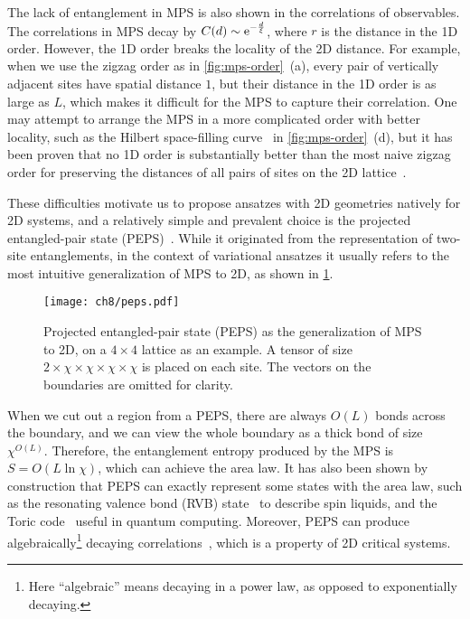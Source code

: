 The lack of entanglement in MPS is also shown in the correlations of observables. The correlations in MPS decay by $C(d) \sim \mathrm{e}^{-\frac{d}{\xi}}$, where $r$ is the distance in the 1D order. However, the 1D order breaks the locality of the 2D distance. For example, when we use the zigzag order as in \cref{fig:mps-order}~(a), every pair of vertically adjacent sites have spatial distance $1$, but their distance in the 1D order is as large as $L$, which makes it difficult for the MPS to capture their correlation. One may attempt to arrange the MPS in a more complicated order with better locality, such as the Hilbert space-filling curve~\cite{hilbert1891uber} in \cref{fig:mps-order}~(d), but it has been proven that no 1D order is substantially better than the most naive zigzag order for preserving the distances of all pairs of sites on the 2D lattice~\cite{xu2012lower}.

These difficulties motivate us to propose ansatzes with 2D geometries natively for 2D systems, and a relatively simple and prevalent choice is the projected entangled-pair state (PEPS)~\cite{verstraete2004renormalization, verstraete2008matrix}. While it originated from the representation of two-site entanglements, in the context of variational ansatzes it usually refers to the most intuitive generalization of MPS to 2D, as shown in \cref{fig:peps}.

\begin{figure}[htb]
\centering
\texttt{[image: ch8/peps.pdf]}
\caption[Projected entangled-pair state (PEPS)]{
Projected entangled-pair state (PEPS) as the generalization of MPS to 2D, on a $4 \times 4$ lattice as an example.
A tensor of size $2 \times \chi \times \chi \times \chi \times \chi$ is placed on each site.
The vectors on the boundaries are omitted for clarity.
}
\label{fig:peps}
\end{figure}

When we cut out a region from a PEPS, there are always $O(L)$ bonds across the boundary, and we can view the whole boundary as a thick bond of size $\chi^{O(L)}$. Therefore, the entanglement entropy produced by the MPS is $S = O(L \ln \chi)$, which can achieve the area law. It has also been shown by construction that PEPS can exactly represent some states with the area law, such as the resonating valence bond (RVB) state~\cite{schuch2012resonating} to describe spin liquids, and the Toric code~\cite{kitaev2003fault, schuch2010peps} useful in quantum computing. Moreover, PEPS can produce algebraically\footnote{Here ``algebraic'' means decaying in a power law, as opposed to exponentially decaying.} decaying correlations~\cite{verstraete2006criticality}, which is a property of 2D critical systems.

